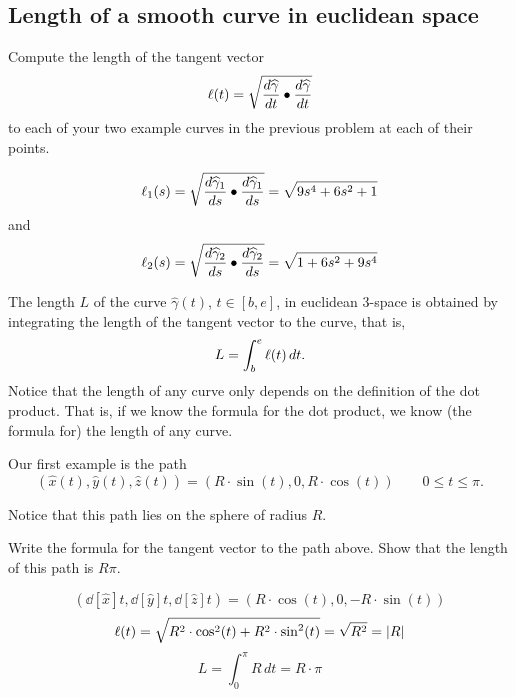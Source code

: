 \documentclass[newpage,hints,handout,nooutcomes,noauthor,12pt]{ximera}
\begin{document}
\subsection{Length of a smooth curve in euclidean space}

\begin{problem}
Compute the length of the tangent vector
\[
\l(t)=\sqrt{\frac{d\hat{\gamma}}{dt}\bullet\frac{d\hat{\gamma}}{dt}}%
\]
to each of your two example curves in the previous problem at each of
their points.



\begin{freeResponse}
\[
\ell_{1}(s) = \sqrt{\frac{d\widehat{\gamma}_{1}}{ds}\bullet\frac{d\widehat{\gamma}_{1}}{ds}} = \sqrt{9s^4 + 6s^2 +1}
\] and
\[ 
\ell_{2}(s) = \sqrt{\frac{d\widehat{\gamma}_{2}}{ds}\bullet\frac{d\widehat{\gamma}_{2}}{ds}} = \sqrt{1 + 6s^2 +9s^4}
\]
\end{freeResponse}

\end{problem}

\begin{definition}
The length $L$ of the curve $\hat{\gamma}(t)$, $t\in[b,e] $, in euclidean
$3$-space is obtained by integrating the length of the tangent vector
to the curve, that is,%
\[
L=\int_{b}^{e} \ell(t)  \,dt.
\]
Notice that the length of any curve only depends on the definition of the dot
product. That is, if we know the formula for the dot product, we know (the
formula for) the length of any curve.
\end{definition}

Our first example is the path%
\[
\left(\hat{x}(t),\hat{y}(t),\hat{z}(t)\right)=\left(R\cdot\sin(t),0,R\cdot\cos(t)\right) \qquad
0 \leq t\leq\pi.
\]


Notice that this path lies on the sphere of radius $R$.

\begin{problem}
  Write the formula for the tangent vector to the path above. Show that the
  length of this path is $R\pi$.

\begin{freeResponse}
\[
\left( \dd[\hat{x}]{t}, \dd[\hat{y}]{t}, \dd[\hat{z}]{t} \right) 
    = \left(R\cdot\cos(t),0,-R\cdot\sin(t) \right)
\]
\[
\ell(t) = \sqrt{
   R^2 \cdot\cos^{2}(t) + R^2 \cdot\sin^{2}(t)} 
   = \sqrt{R^2} = |R|
\]
\[
L=\int_{0}^{\pi} R \,dt = R\cdot\pi
\]
\end{freeResponse}

\end{problem}
\end{document}
